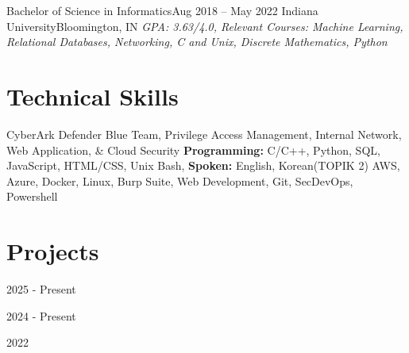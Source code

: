 \documentclass{resume}
\begin{document}
  \resumeEntryStart
    \resumeEntryTSDL
    {Bachelor of Science in Informatics}{Aug 2018 -- May 2022}
    {Indiana University}{Bloomington, IN}
      {\newline{}\newline{}\scriptsize \textit{ \footnotesize{GPA: 3.63/4.0, Relevant Courses: Machine Learning, Relational Databases, Networking, C and Unix, Discrete Mathematics, Python}}}
  \resumeEntryEnd

\section{Technical Skills}
 \resumeTechnicalEntryStart
   {CyberArk Defender}
   {Blue Team, Privilege Access Management, Internal Network, Web Application, \& Cloud Security}
   {\textbf{Programming:} C/C++, Python, SQL, JavaScript, HTML/CSS, Unix Bash, \textbf{Spoken:} English, Korean(TOPIK 2)}
   {AWS, Azure, Docker, Linux, Burp Suite, Web Development, Git, SecDevOps, Powershell}
  \resumeTechnicalEntryEnd

\section{Projects}
  \resumeProjectEntryStart
    \resumeEntryTD
      {\passmeter}{2025 - Present}
    \resumeItemListStart
    \resumeItemListEnd
  \resumeProjectEntryEnd 
  
  \resumeProjectEntryStart
    \resumeEntryTD
      {\potionprogramming}{2024 - Present}
    \resumeItemListStart
    \resumeItemListEnd
  \resumeProjectEntryEnd

  \resumeProjectEntryStart
    \resumeEntryTD
      {\rowhammerattackresearch}{2022}
    \resumeItemListStart  
    \resumeItemListEnd  
  \resumeProjectEntryEnd  
\end{document}
